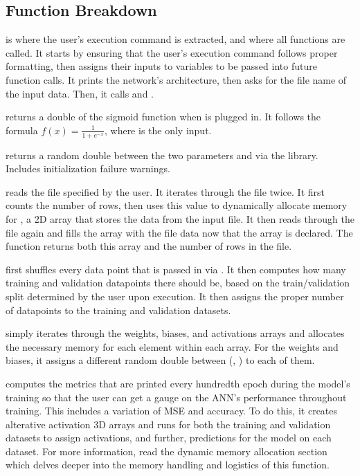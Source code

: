 \documentclass[12pt]{article}
\begin{document}
\subsection{Function Breakdown}

 is where the user’s execution command is extracted, and where all functions are called. It starts by ensuring that the user’s execution command follows proper formatting, then assigns their inputs to variables to be passed into future function calls. It prints the network’s architecture, then asks for the file name of the input data. Then, it calls  and .

 returns a double of the sigmoid function when  is plugged in. It follows the formula \(f(x) = \frac{1}{1 + e^{-x}}\), where  is the only input.

 returns a random double between the two parameters  and  via the  library. Includes  initialization failure warnings.

 reads the file specified by the user. It iterates through the file twice. It first counts the number of rows, then uses this value to dynamically allocate memory for , a 2D array that stores the data from the input file. It then reads through the file again and fills the array with the file data now that the array is declared. The function returns both this  array and the number of rows in the file.

 first shuffles every data point that is passed in via . It then computes how many training and validation datapoints there should be, based on the train/validation split determined by the user upon execution. It then assigns the proper number of datapoints to the training and validation datasets.

 simply iterates through the weights, biases, and activations arrays and allocates the necessary memory for each element within each array. For the weights and biases, it assigns a different random double between (, ) to each of them.

 computes the metrics that are printed every hundredth epoch during the model’s training so that the user can get a gauge on the ANN’s performance throughout training. This includes a variation of MSE and accuracy. To do this, it creates alterative activation 3D arrays and runs  for both the training and validation datasets to assign activations, and further, predictions for the model on each dataset. For more information, read the dynamic memory allocation section which delves deeper into the memory handling and logistics of this function.
\end{document}
